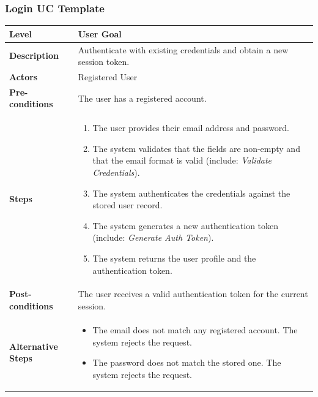 \subsubsection{Login UC Template}
\begin{longtable}{|p{3.5cm}|p{10.3cm}|}
\hline
\rowcolor{UCRow} \textbf{Level} & User Goal \\ \hline
\textbf{Description} & Authenticate with existing credentials and obtain a new session token. \\ \hline
\rowcolor{UCRow} \textbf{Actors} & Registered User \\ \hline
\textbf{Pre-conditions} & The user has a registered account. \\ \hline
\rowcolor{UCRow} \textbf{Steps} &
\begin{enumerate}[nosep, leftmargin=*]
    \item The user provides their email address and password.
    \item The system validates that the fields are non-empty and that the email format is valid (include: \textit{Validate Credentials}).
    \item The system authenticates the credentials against the stored user record.
    \item The system generates a new authentication token (include: \textit{Generate Auth Token}).
    \item The system returns the user profile and the authentication token.
\end{enumerate} \\ \hline
\textbf{Post-conditions} & The user receives a valid authentication token for the current session. \\ \hline
\rowcolor{UCRow} \textbf{Alternative Steps} &
\begin{itemize}[nosep, leftmargin=2.5em]
    \item[\textbf{A1.}] The email does not match any registered account. The system rejects the request.
    \item[\textbf{A2.}] The password does not match the stored one. The system rejects the request.
\end{itemize} \\ \hline
\end{longtable}

